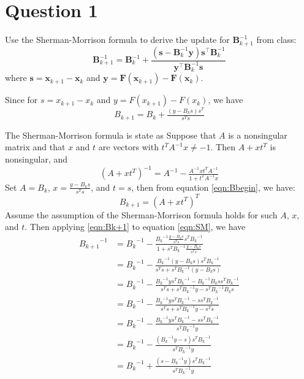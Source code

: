 \section{Question 1}

\begin{question}
    Use the Sherman-Morrison formula to derive the update for $\mathbf{B}_{k+1}^{-1}$ from class:
    \begin{equation*}
        \mathbf{B}_{k+1}^{-1} = \mathbf{B}_{k}^{-1} + \frac{(\mathbf{s}-\mathbf{B}_k^{-1}\mathbf{y})\mathbf{s}^\top\mathbf{B}_k^{-1}}{\mathbf{y}^\top \mathbf{B}_k^{-1}\mathbf{s}}
    \end{equation*}
    where $\mathbf{s} = \mathbf{x}_{k+1}-\mathbf{x}_k$ and $\mathbf{y} =\mathbf{F}(\mathbf{x}_{k+1}) - \mathbf{F}(\mathbf{x}_k)$.
\end{question}

\begin{answer}
    Since for $s = x_{k+1}-x_k$ and $y = F(x_{k+1}) - F(x_k)$, we have
    \begin{equation}\label{eqn:Bbegin}
        B_{k+1} = B_{k} + \tfrac{(y-B_ks)s^{T}}{s^{T}s}
    \end{equation}
    
    The Sherman-Morrison formula is state as
    Suppose that $A$ is a nonsingular matrix and that $x$ and $t$ are vectors with $t^{T}A^{-1}x \neq -1$. Then $A + xt^{T}$ is nonsingular, and
    \begin{equation}\label{eqn:SM}
        {(A + xt^{T})}^{-1} = A^{-1} - \tfrac{A^{-1}xt^{T}A^{-1}}{1 + t^{T}A^{-1}x}
    \end{equation}
    Set $A = B_{k}$, $x = \tfrac{y - B_{k}s}{s^{T}s}$, and $t = s$, then from equation \ref{eqn:Bbegin}, we have:
    \begin{equation}\label{eqn:Bk+1}
        B_{k+1} = {(A+xt^{T})}^{T}
    \end{equation}
    Assume the assumption of the Sherman-Morrison formula holds for such $A$, $x$, and $t$. Then applying \ref{eqn:Bk+1} to equation \ref{eqn:SM}, we have
    \begin{align}
        {B_{k+1}}^{-1} &= {B_{k}}^{-1} - \tfrac{{B_{k}}^{-1}\tfrac{y - B_{k}s}{s^{T}s}s^{T}{B_{k}}^{-1}}{1 + s^{T}{B_{k}}^{-1}\tfrac{y - B_{k}s}{s^{T}s}}\\
        &= {B_{k}}^{-1} - \tfrac{{B_{k}}^{-1}(y - B_{k}s)s^{T}{B_{k}}^{-1}}{s^{T}s + s^{T}{B_{k}}^{-1}(y - B_{k}s)}\\
        &= {B_{k}}^{-1} - \tfrac{{B_{k}}^{-1}ys^{T}{B_{k}}^{-1} - {B_{k}}^{-1}B_{k}ss^{T}{B_{k}}^{-1}}{s^{T}s + s^{T}{B_{k}}^{-1}y - s^{T}{B_{k}}^{-1}B_{k}s}\\
        &= {B_{k}}^{-1} - \tfrac{{B_{k}}^{-1}ys^{T}{B_{k}}^{-1} - ss^{T}{B_{k}}^{-1}}{s^{T}s + s^{T}{B_{k}}^{-1}y - s^{T}s}\\
        &= {B_{k}}^{-1} - \tfrac{{B_{k}}^{-1}ys^{T}{B_{k}}^{-1} - ss^{T}{B_{k}}^{-1}}{s^{T}{B_{k}}^{-1}y}\\
        &= {B_{k}}^{-1} - \tfrac{({B_{k}}^{-1}y - s)s^{T}{B_{k}}^{-1}}{s^{T}{B_{k}}^{-1}y}\\
        &= {B_{k}}^{-1} + \tfrac{(s - {B_{k}}^{-1}y)s^{T}{B_{k}}^{-1}}{s^{T}{B_{k}}^{-1}y}
    \end{align}
\end{answer}
